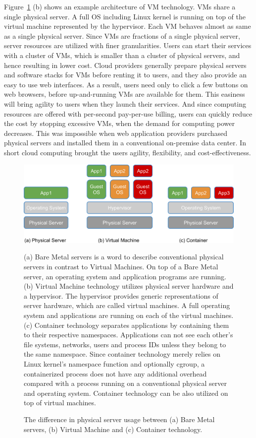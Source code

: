 Figure~\ref{fig:physical_vm_container} (b) shows an example architecture of VM technology. 
VMs share a single physical server.
A full OS including Linux kernel is running on top of the virtual machine represented by the hypervisor.
Each VM behaves almost as same as a single physical server.
Since VMs are fractions of a single physical server, server resources are utilized with finer granularities.
Users can start their services with a cluster of VMs, which is smaller than a cluster of physical servers, and hence resulting in lower cost.
Cloud providers generally prepare physical servers and software stacks for VMs before renting it to users, and they also provide an easy to use web interfaces. 
As a result, users need only to click a few buttons on web browsers, before up-and-running VMs are available for them.
This easiness will bring agility to users when they launch their services.
And since computing resources are offered with per-second pay-per-use billing, users can quickly reduce the cost by stopping excessive VMs, when the demand for computing power decreases.
This was impossible when web application providers purchased physical servers and installed them in a conventional on-premise data center.
In short cloud computing brought the users agility, flexibility, and cost-effectiveness.

\begin{figure}[h]
\begin{center}
\includegraphics[width=0.8\columnwidth]{Figs/physical_vm_container.png}
\end{center}
\caption{
The difference in physical server usage between (a) Bare Metal servers, (b) Virtual Machine and (c) Container technology.
}

(a) Bare Metal servers is a word to describe conventional physical servers in contrast to Virtual Machines.
On top of a Bare Metal server, an operating system and application programs are running.
(b) Virtual Machine technology utilizes physical server hardware and a hypervisor.
The hypervisor provides generic representations of server hardware, which are called virtual machines.
A full operating system and applications are running on each of the virtual machines.
(c) Container technology separates applications by containing them to their respective namespaces.
Applications can not see each other's file systems, networks, users and process IDs unless they belong to the same namespace.
Since container technology merely relies on Linux kernel's namespace function and optionally cgroup, a containerized process does not have any additional overhead compared with a process running on a conventional physical server and operating system.
Container technology can be also utilized on top of virtual machines.

\label{fig:physical_vm_container}
\end{figure}

